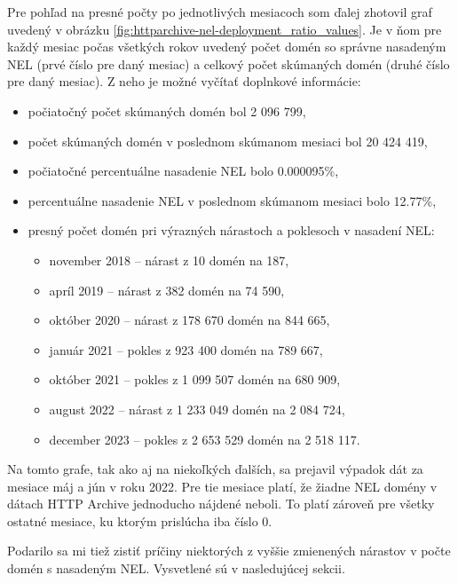Pre pohľad na presné počty po jednotlivých mesiacoch som ďalej zhotovil graf uvedený v obrázku \ref{fig:httparchive-nel-deployment_ratio_values}.
Je v ňom pre každý mesiac počas všetkých rokov uvedený počet domén so správne nasadeným NEL (prvé číslo pre daný mesiac) a celkový počet skúmaných domén (druhé číslo pre daný mesiac). 
Z neho je možné vyčítať doplnkové informácie:
\begin{itemize}
    \item počiatočný počet skúmaných domén bol 2 096 799, 
    \item počet skúmaných domén v poslednom skúmanom mesiaci bol 20 424 419,
    \item počiatočné percentuálne nasadenie NEL bolo 0.000095\%,
    \item percentuálne nasadenie NEL v poslednom skúmanom mesiaci bolo 12.77\%,
    \item presný počet domén pri výrazných nárastoch a poklesoch v nasadení NEL:
    \begin{itemize}
        \item november 2018 -- nárast z 10 domén na 187,
        \item apríl 2019 -- nárast z 382 domén na 74 590,
        \item október 2020 -- nárast z 178 670 domén na 844 665,
        \item január 2021 -- pokles z 923 400 domén na 789 667,
        \item október 2021 -- pokles z 1 099 507 domén na 680 909,
        \item august 2022 -- nárast z 1 233 049 domén na 2 084 724,
        \item december 2023 -- pokles z 2 653 529 domén na 2 518 117.
    \end{itemize}
\end{itemize}

Na tomto grafe, tak ako aj na niekoľkých ďalších, sa prejavil výpadok dát za mesiace máj a jún v roku 2022.
Pre tie mesiace platí, že žiadne NEL domény v dátach HTTP Archive jednoducho nájdené neboli. 
To platí zároveň pre všetky ostatné mesiace, ku ktorým prislúcha iba číslo 0.

Podarilo sa mi tiež zistiť príčiny niektorých z vyššie zmienených nárastov v počte domén s nasadeným NEL.
Vysvetlené sú v nasledujúcej sekcii.

